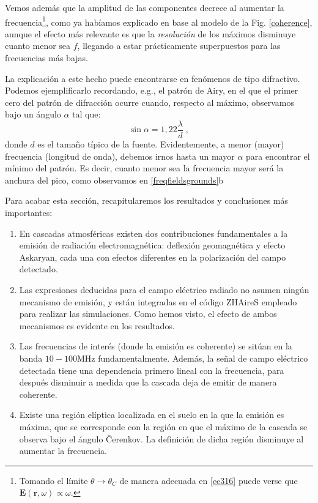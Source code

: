 \documentclass[11 pt, a4paper]{article} %
\numberwithin{equation}{section}
\numberwithin{figure}{section}
\numberwithin{table}{section}
\newcommand{\vect}[1]{\boldsymbol{\mathbf{#1}}}
\begin{document}
Vemos además que la amplitud de las componentes decrece al aumentar la frecuencia\footnote{ Tomando el límite $\theta\rightarrow\theta_C$ de manera adecuada en \eqref{ec316} puede verse que $\vect{E}\left(\vect{r},\omega\right)\propto\omega$.}, como ya habíamos explicado en base al modelo de la Fig. \ref{coherence}, aunque el efecto más relevante es que la \textit{resolución} de los máximos disminuye cuanto menor sea $f$, llegando a estar prácticamente superpuestos para las frecuencias más bajas. 

La explicación a este hecho puede encontrarse en fenómenos de tipo difractivo. Podemos ejemplificarlo recordando, e.g., el patrón de Airy, en el que el primer cero del patrón de difracción ocurre cuando, respecto al máximo, observamos bajo un ángulo $\alpha$ tal que:
\begin{equation}
	\sin\alpha=1,22\frac{\lambda}{d}\;,\label{ec318}
\end{equation}  
donde $d$ es el tamaño típico de la fuente. Evidentemente, a menor (mayor) frecuencia (longitud de onda), debemos irnos hasta un mayor $\alpha$ para encontrar el mínimo del patrón. Es decir, cuanto menor sea la frecuencia mayor será la anchura del pico, como observamos en \ref{freqfieldsgrounds}b

Para acabar esta sección, recapitularemos los resultados y conclusiones más importantes:
\begin{enumerate}
	\item En cascadas atmosféricas existen dos contribuciones fundamentales a la emisión de radiación electromagnética: deflexión geomagnética y efecto Askaryan, cada una con efectos diferentes en la polarización del campo detectado.
	\item Las expresiones deducidas para el campo eléctrico radiado no asumen ningún mecanismo de emisión, y están integradas en el código ZHAireS empleado para realizar las simulaciones. Como hemos visto, el efecto de ambos mecanismos es evidente en los resultados.
	\item Las frecuencias de interés (donde la emisión es coherente) se sitúan en la banda $10-100\mathrm{MHz}$ fundamentalmente. Además, la señal de campo eléctrico detectada tiene una dependencia primero lineal con la frecuencia, para después disminuir a medida que la cascada deja de emitir de manera coherente. 
	\item Existe una región elíptica localizada en el suelo en la que la emisión es máxima, que se corresponde con la región en que el máximo de la cascada se observa bajo el ángulo \v{C}erenkov. La definición de dicha región disminuye al aumentar la frecuencia.
\end{enumerate}
\clearpage
\end{document}
